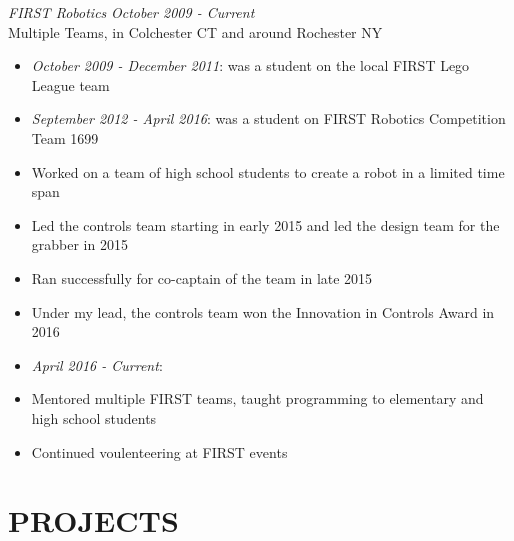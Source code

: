\documentclass[line,margin]{res}
\begin{document}
\begin{resume}
	{\sl FIRST Robotics} \hfill {\sl October 2009 - Current}\\
		Multiple Teams, in Colchester CT and around Rochester NY
		\begin{itemize}
			\item \textit{October 2009 - December 2011}: was a student on the local FIRST Lego League team
			\item \textit{September 2012 - April 2016}: was a student on FIRST Robotics Competition Team 1699
			\item Worked on a team of high school students to create a robot in a limited time span
			\item Led the controls team starting in early 2015 and led the design team for the grabber in 2015
			\item Ran successfully for co-captain of the team in late 2015
			\item Under my lead, the controls team won the Innovation in Controls Award in 2016%
			\item \textit{April 2016 - Current}:
			\item Mentored multiple FIRST teams, taught programming to elementary and high school students
			\item Continued voulenteering at FIRST events
		\end{itemize}

\section{PROJECTS}
	

\end{resume}
\end{document}
